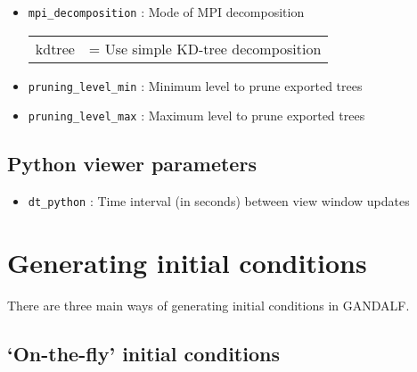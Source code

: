 \documentclass[a4paper]{article}
\newcommand{\var}[1]{\texttt{#1}}
\begin{document}
\begin{itemize}

\item \var{mpi\_decomposition}  : Mode of MPI decomposition \\
\begin{tabular}{ll}
kdtree & = Use simple KD-tree decomposition
\end{tabular}
\item \var{pruning\_level\_min} : Minimum level to prune exported trees
\item \var{pruning\_level\_max} : Maximum level to prune exported trees

\end{itemize}



\subsection{Python viewer parameters}

\begin{itemize}

\item \var{dt\_python} : Time interval (in seconds) between view window updates

\end{itemize}


\newpage




\section{Generating initial conditions}

There are three main ways of generating initial conditions in GANDALF.



\subsection{`On-the-fly' initial conditions}
\end{document}
